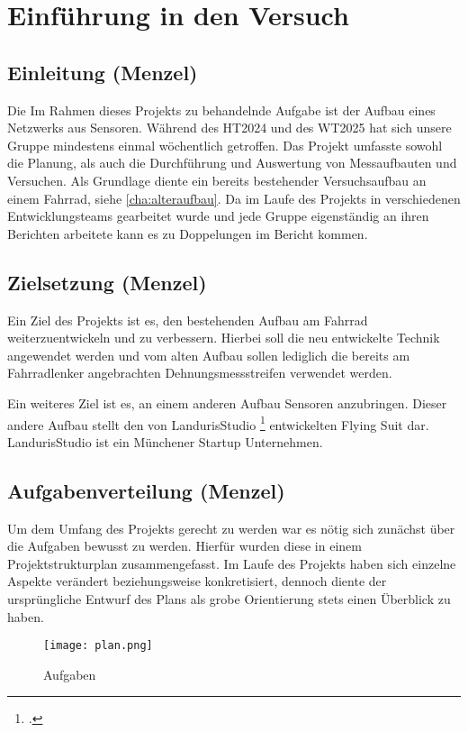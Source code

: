 \chapter{Einführung in den Versuch}
\label{cha:einfuehrung}
\todo{}
\section{Einleitung (Menzel)}

Die Im Rahmen dieses Projekts zu behandelnde Aufgabe ist der Aufbau eines Netzwerks aus Sensoren.
Während des HT2024 und des WT2025 hat sich unsere Gruppe mindestens einmal wöchentlich getroffen.
Das Projekt umfasste sowohl die Planung, als auch die Durchführung und Auswertung von Messaufbauten und Versuchen.
Als Grundlage diente ein bereits bestehender Versuchsaufbau an einem Fahrrad, siehe \ref{cha:alteraufbau}.
Da im Laufe des Projekts in verschiedenen Entwicklungsteams gearbeitet wurde und jede Gruppe eigenständig an ihren Berichten arbeitete kann es zu Doppelungen im Bericht kommen.

\section{Zielsetzung (Menzel)}
Ein Ziel des Projekts ist es, den bestehenden Aufbau am Fahrrad weiterzuentwickeln und zu verbessern.
Hierbei soll die neu entwickelte Technik angewendet werden und vom alten Aufbau sollen lediglich die bereits am Fahrradlenker angebrachten Dehnungsmessstreifen verwendet werden.

Ein weiteres Ziel ist es, an einem anderen Aufbau Sensoren anzubringen.
Dieser andere Aufbau stellt den von LandurisStudio \footcite{https://www.landuris.com/} entwickelten Flying Suit dar.
LandurisStudio ist ein Münchener Startup Unternehmen.


\newpage
\section{Aufgabenverteilung (Menzel)}
Um dem Umfang des Projekts gerecht zu werden war es nötig sich zunächst über die Aufgaben bewusst zu werden.
Hierfür wurden diese in einem Projektstrukturplan zusammengefasst.
Im Laufe des Projekts haben sich einzelne Aspekte verändert beziehungsweise konkretisiert, dennoch diente der ursprüngliche Entwurf des Plans als grobe Orientierung stets einen Überblick zu haben.

\begin{figure}[h]
    \begin{center}
        \texttt{[image: plan.png]}
        \caption[Aufgaben (Abbildungsverzeichnis)]{Aufgaben
        }
        \label{fig:plan}
    \end{center}
\end{figure}


